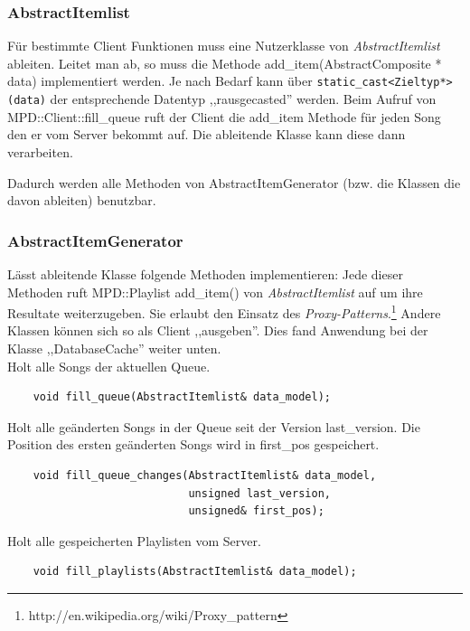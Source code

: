 \subsubsection{AbstractItemlist}
Für bestimmte Client Funktionen muss eine Nutzerklasse von \emph{AbstractItemlist} ableiten.
Leitet man ab, so muss die Methode add\_item(AbstractComposite * data) implementiert werden. 
Je nach Bedarf kann über \verb+static_cast<Zieltyp*>(data)+ der entsprechende Datentyp ,,rausgecasted'' werden.
Beim Aufruf von MPD::Client::fill\_queue ruft der Client die add\_item Methode für jeden 
Song den er vom Server bekommt auf. Die ableitende Klasse kann diese dann verarbeiten.

Dadurch werden alle Methoden von AbstractItemGenerator (bzw. die Klassen die davon ableiten) benutzbar.

\subsubsection{AbstractItemGenerator}
%
%
%

Lässt ableitende Klasse folgende Methoden implementieren:
Jede dieser Methoden ruft MPD::Playlist add\_item() von \emph{AbstractItemlist} auf um ihre Resultate weiterzugeben.
Sie erlaubt den Einsatz des \emph{Proxy-Patterns}.\footnote{http://en.wikipedia.org/wiki/Proxy\_pattern}
Andere Klassen können sich so als Client ,,ausgeben''.
Dies fand Anwendung bei der Klasse ,,DatabaseCache'' weiter unten.
\\
Holt alle Songs der aktuellen Queue.
\begin{verbatim}            
    void fill_queue(AbstractItemlist& data_model);
\end{verbatim}

Holt alle geänderten Songs in der Queue seit der Version last\_version. Die Position des ersten geänderten Songs wird in first\_pos gespeichert. 
\begin{verbatim}
    void fill_queue_changes(AbstractItemlist& data_model,
                            unsigned last_version,
                            unsigned& first_pos);
\end{verbatim}

Holt alle gespeicherten Playlisten vom Server.
\begin{verbatim}              
    void fill_playlists(AbstractItemlist& data_model);
\end{verbatim}

